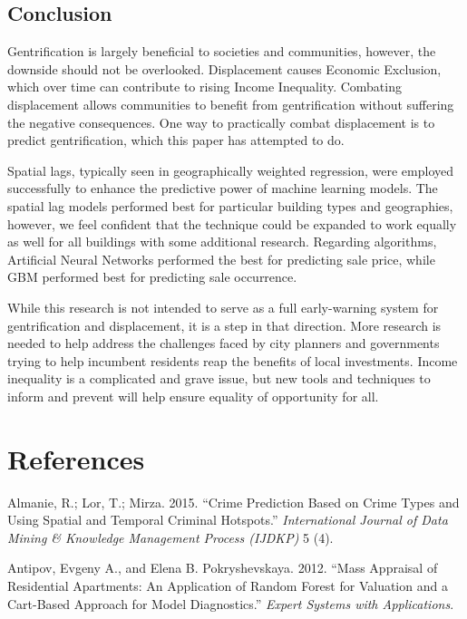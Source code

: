 \documentclass[12pt,]{article}
\begin{document}
\hypertarget{conclusion}{%
\subsection{Conclusion}\label{conclusion}}

Gentrification is largely beneficial to societies and communities,
however, the downside should not be overlooked. Displacement causes
Economic Exclusion, which over time can contribute to rising Income
Inequality. Combating displacement allows communities to benefit from
gentrification without suffering the negative consequences. One way to
practically combat displacement is to predict gentrification, which this
paper has attempted to do.

Spatial lags, typically seen in geographically weighted regression, were
employed successfully to enhance the predictive power of machine
learning models. The spatial lag models performed best for particular
building types and geographies, however, we feel confident that the
technique could be expanded to work equally as well for all buildings
with some additional research. Regarding algorithms, Artificial Neural
Networks performed the best for predicting sale price, while GBM
performed best for predicting sale occurrence.

While this research is not intended to serve as a full early-warning
system for gentrification and displacement, it is a step in that
direction. More research is needed to help address the challenges faced
by city planners and governments trying to help incumbent residents reap
the benefits of local investments. Income inequality is a complicated
and grave issue, but new tools and techniques to inform and prevent will
help ensure equality of opportunity for all.

\newpage

\hypertarget{references}{%
\section*{References}\label{references}}

\hypertarget{refs}{}
\leavevmode\hypertarget{ref-Almanie2015}{}%
Almanie, R.; Lor, T.; Mirza. 2015. ``Crime Prediction Based on Crime
Types and Using Spatial and Temporal Criminal Hotspots.''
\emph{International Journal of Data Mining \& Knowledge Management
Process (IJDKP)} 5 (4).

\leavevmode\hypertarget{ref-antipov12}{}%
Antipov, Evgeny A., and Elena B. Pokryshevskaya. 2012. ``Mass Appraisal
of Residential Apartments: An Application of Random Forest for Valuation
and a Cart-Based Approach for Model Diagnostics.'' \emph{Expert Systems
with Applications}.
\end{document}
